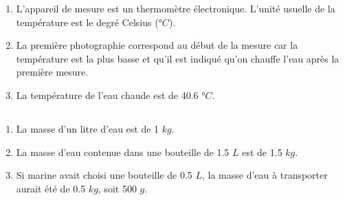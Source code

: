 \documentclass[12pt,a4paper]{article}
\begin{document}
\begin{enumerate}[label=\alph*)]
	\item L'appareil de mesure est un thermomètre électronique. L'unité usuelle de la température est le degré Celsius (°$C$).
	\item La première photographie correspond au début de la mesure car la température est la plus basse et qu'il est indiqué qu'on chauffe l'eau après la première mesure.
	\item La température de l'eau chaude est de \num{40.6} °$C$.
\end{enumerate}

\subsection*{}


\begin{enumerate}[label=\alph*)]
	\item La masse d'un litre d'eau est de 1 $kg$.
	\item La masse d'eau contenue dans une bouteille de \num{1.5} $L$ est de \num{1.5} $kg$.
	\item Si marine avait choisi une bouteille de \num{0.5} $L$, la masse d'eau à transporter aurait été de \num{0.5} $kg$, soit 500 $g$.
\end{enumerate}
\end{document}
